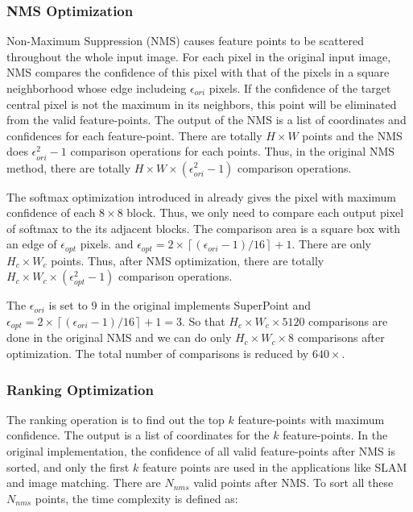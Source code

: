 \subsubsection{NMS Optimization}

Non-Maximum Suppression (NMS) causes feature points to be scattered throughout the whole input image. 
For each pixel in the original input image, NMS compares the confidence of this pixel with that of the pixels in a square neighborhood whose edge includeing $\epsilon _{ori}$ pixels. 
If the confidence of the target central pixel is not the maximum in its neighbors, this point will be eliminated from the valid feature-points. 
The output of the NMS is a list of coordinates and confidences for each feature-point. 
There are totally $H \times W$ points and the NMS does $\epsilon _{ori} ^ 2 - 1$ comparison operations for each points. 
Thus, in the original NMS method, there are totally $H \times W \times (\epsilon _{ori} ^ 2 - 1)$ comparison operations.

The softmax optimization introduced in  already gives the pixel with maximum confidence of each $8 \times 8$ block. Thus, we only need to compare each output pixel of softmax to the its adjacent blocks. The comparison area is a square box with an edge of $\epsilon _{opt}$ pixels. and $\epsilon _{opt} = 2\times \left \lceil (\epsilon _{ori}-1)/16 \right \rceil +1$. There are only $H_c \times W_c$ points. Thus, after NMS optimization, there are totally $H_c \times W_c \times (\epsilon _{opt} ^ 2 - 1)$ comparison operations.

The $\epsilon _{ori}$ is set to 9 in the original implements SuperPoint and $\epsilon _{opt} = 2\times \left \lceil (\epsilon _{ori}-1)/16 \right \rceil +1 = 3$. So that $H_c \times W_c \times 5120 $ comparisons are done in the original NMS and we can do only $H_c \times W_c \times 8$ comparisons after optimization. The total number of comparisons is reduced by $640\times$.

\subsubsection{Ranking Optimization}

The ranking operation is to find out the top $k$ feature-points with maximum confidence. 
The output is a list of coordinates for the $k$ feature-points. 
In the original implementation, the confidence of all valid feature-points after NMS is sorted, and only the first $k$ feature points are used in the applications like SLAM and image matching. 
There are $N_{nms}$ valid points after NMS. To sort all these $N_{nms}$ points, the time complexity is defined as:

